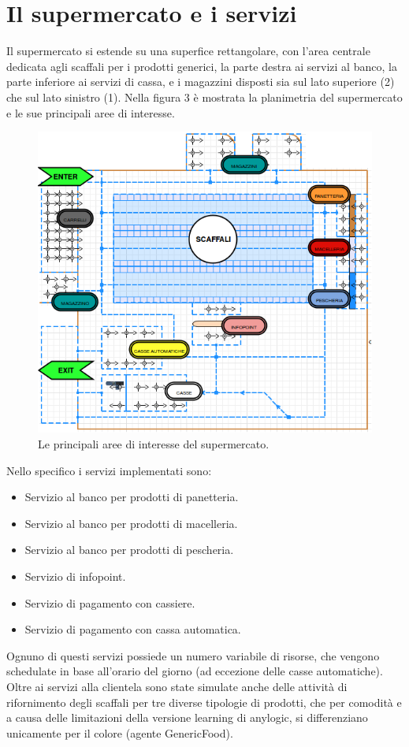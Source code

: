 \documentclass{article}
\begin{document}
\section{Il supermercato e i servizi}
Il supermercato si estende su una superfice rettangolare, con l'area centrale dedicata agli scaffali per i prodotti generici, la parte destra ai servizi al banco, la parte inferiore ai servizi di cassa, e i magazzini disposti sia sul lato superiore (2) che sul lato sinistro (1). Nella figura 3 è mostrata la planimetria del supermercato e le sue principali aree di interesse.
\begin{center}
\begin{figure}[h]
\center
\label{planim}
\includegraphics[scale=0.5]{./planimetria1.png}
\caption{\footnotesize{Le principali aree di interesse del supermercato.}}
\end{figure}
\end{center}
Nello specifico i servizi implementati sono:
\begin{itemize}
\item Servizio al banco per prodotti di panetteria.
\item Servizio al banco per prodotti di macelleria.
\item Servizio al banco per prodotti di pescheria.
\item Servizio di infopoint.
\item Servizio di pagamento con cassiere.
\item Servizio di pagamento con cassa automatica.
\end{itemize}
Ognuno di questi servizi possiede un numero variabile di risorse, che vengono schedulate in base all'orario del giorno (ad eccezione delle casse automatiche).
\newline
\newline
Oltre ai servizi alla clientela sono state simulate anche delle attività di rifornimento degli scaffali per tre diverse tipologie di prodotti, che per comodità e a causa delle limitazioni della versione learning di anylogic, si differenziano unicamente per il colore (agente GenericFood).
\end{document}
